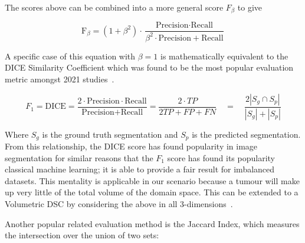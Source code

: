 \documentclass[12pt,twoside]{report}
\begin{document}
The scores above can be combined into a more general score $F_\beta$ to give

\begin{equation*}
  \text{F}_\beta = (1+\beta^2)\cdot \frac{\text{Precision} \cdot \text{Recall}}{\beta^2 \cdot \text{Precision}+\text{Recall}}
\end{equation*}

A specific case of this equation with $\beta=1$ is mathematically equivalent to the DICE Similarity Coefficient which was found to be the most popular evaluation metric amongst 2021 studies~\cite{review-metrics,evaluation-metrics, Sherer2021-le}.


\begin{equation*}
  F_1 = \text{DICE} = \frac{2 \cdot \text{Precision} \cdot \text{Recall}} {\text{Precision} + \text{Recall}} = \frac{2 \cdot TP}{2TP + FP + FN} \quad = \quad \frac{2|S_g\cap S_p|}{|S_g|+|S_p|}
\end{equation*}

Where $S_g$ is the ground truth segmentation and $S_p$ is the predicted segmentation. From this relationship, the DICE score has found popularity in image segmentation for similar reasons that the $F_1$ score has found its popularity classical machine learning; it is able to provide a fair result for imbalanced datasets. This mentality is applicable in our scenario because a tumour will make up very little of the total volume of the domain space. This can be extended to a Volumetric DSC by considering the above in all 3-dimensions~\cite{APL}.

Another popular related evaluation method is the Jaccard Index, which measures the intersection over the union of two sets:
\end{document}

